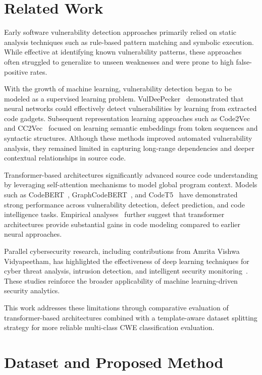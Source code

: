 \documentclass[conference]{IEEEtran}
\begin{document}
\section{Related Work}

Early software vulnerability detection approaches primarily relied on static analysis techniques such as rule-based pattern matching and symbolic execution. While effective at identifying known vulnerability patterns, these approaches often struggled to generalize to unseen weaknesses and were prone to high false-positive rates.

With the growth of machine learning, vulnerability detection began to be modeled as a supervised learning problem. VulDeePecker~\cite{vuldee} demonstrated that neural networks could effectively detect vulnerabilities by learning from extracted code gadgets. Subsequent representation learning approaches such as Code2Vec~\cite{code2vec} and CC2Vec~\cite{cc2vec} focused on learning semantic embeddings from token sequences and syntactic structures. Although these methods improved automated vulnerability analysis, they remained limited in capturing long-range dependencies and deeper contextual relationships in source code.

Transformer-based architectures significantly advanced source code understanding by leveraging self-attention mechanisms to model global program context. Models such as CodeBERT~\cite{codebert}, GraphCodeBERT~\cite{graphcodebert}, and CodeT5~\cite{codet5} have demonstrated strong performance across vulnerability detection, defect prediction, and code intelligence tasks. Empirical analyses~\cite{chen2022,msr2020} further suggest that transformer architectures provide substantial gains in code modeling compared to earlier neural approaches.

Parallel cybersecurity research, including contributions from Amrita Vishwa Vidyapeetham, has highlighted the effectiveness of deep learning techniques for cyber threat analysis, intrusion detection, and intelligent security monitoring~\cite{amrita1,amrita2}. These studies reinforce the broader applicability of machine learning-driven security analytics.

This work addresses these limitations through comparative evaluation of transformer-based architectures combined with a template-aware dataset splitting strategy for more reliable multi-class CWE classification evaluation.

\section{Dataset and Proposed Method}
\end{document}
